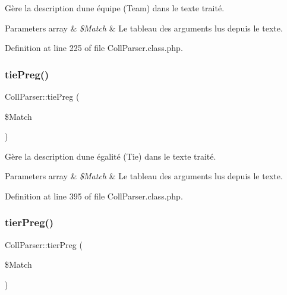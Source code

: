 Gère la description d\textquotesingle{}une équipe (Team) dans le texte traité.


\begin{DoxyParams}[1]{Parameters}
array & {\em \$\+Match} & Le tableau des arguments lus depuis le texte. \\
\hline
\end{DoxyParams}


Definition at line 225 of file Coll\+Parser.\+class.\+php.

\mbox{\label{class_coll_parser_a6fa0362052ba34bde64b06a953320dc2}} 
\subsubsection{\texorpdfstring{tie\+Preg()}{tiePreg()}}
{\footnotesize\ttfamily Coll\+Parser\+::tie\+Preg (\begin{DoxyParamCaption}\item[{}]{\$\+Match }\end{DoxyParamCaption})\hspace{0.3cm}{\ttfamily [protected]}}

Gère la description d\textquotesingle{}une égalité (Tie) dans le texte traité.


\begin{DoxyParams}[1]{Parameters}
array & {\em \$\+Match} & Le tableau des arguments lus depuis le texte. \\
\hline
\end{DoxyParams}


Definition at line 395 of file Coll\+Parser.\+class.\+php.

\mbox{\label{class_coll_parser_a21dea24b254ec24a5d0cb5c233043a8d}} 
\subsubsection{\texorpdfstring{tier\+Preg()}{tierPreg()}}
{\footnotesize\ttfamily Coll\+Parser\+::tier\+Preg (\begin{DoxyParamCaption}\item[{}]{\$\+Match }\end{DoxyParamCaption})\hspace{0.3cm}{\ttfamily [protected]}}

